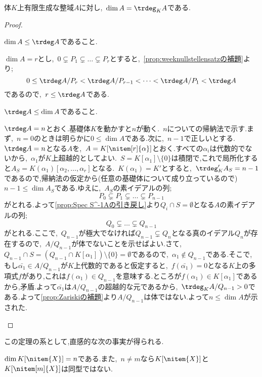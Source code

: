 \begin{thm}\label{thm:有限生成な整域は次元と超越次元が同じ}
	体$K$上有限生成な整域$A$に対し,~$\dim A=\trdeg_K A$である.
\end{thm}
\begin{proof}
	\begin{step}
		\item $\dim A\leq\trdeg A$であること.
		
		$\dim A=r$とし,~$0\subsetneq P _1\subsetneq\dots\subsetneq P _r$とすると,~\ref{prop:weeknullstellensatzの補題}より;
		\[0\leq\trdeg A/ P _r<\trdeg A/ P _{r-1}<\dots<\trdeg A/ P _1<\trdeg A\]
		であるので,~$r\leq\trdeg A$である.
		
		\item $\trdeg A\leq\dim A$であること.
		
		$\trdeg A=n$とおく.基礎体$K$を動かすと$n$が動く.~$n$についての帰納法で示す.まず,~$n=0$のときは明らかに$0\leq\dim A$である.次に,~$n-1$で正しいとする.~$\trdeg A=n$となる$A$を,~$A=K[\nitem[r]{\alpha}]$とおく.すべての$\alpha_i$は代数的でないから,~$\alpha_1$が$K$上超越的としてよい.~$S=K[\alpha_1]\setminus\{0\}$は積閉で,これで局所化すると$A_S=K(\alpha_1)[\alpha_2,\dots,\alpha_r]$となる.~$K(\alpha_1)=K'$とすると,~$\trdeg_K' A_S=n-1$であるので,帰納法の仮定から(任意の基礎体について成り立っているので)~$n-1\leq\dim A_S$である.ゆえに,~$A_S$の素イデアルの列;
		\[ P _0\subsetneq P _1\subsetneq\dots\subsetneq P _{n-1}\]
		がとれる.よって\ref{prop:Spec S^-1Aの引き戻し}より$ Q _i\cap S=\emptyset$となる$A$の素イデアルの列;
		\[ Q _0\subsetneq\dots\subsetneq Q _{n-1}\]
		がとれる.ここで,~$ Q _{n-1}$が極大でなければ$ Q _{n-1}\subsetneq Q _n$となる真のイデアル$ Q _n$が存在するので,~$A/ Q _{n-1}$が体でないことを示せばよい.さて,~$ Q _{n-1}\cap S=( Q _{n-1}\cap K[\alpha_1])\setminus\{0\}=\emptyset$であるので,~$\alpha_1\not\in Q _{n-1}$である.そこで,もし$\bar{\alpha_1}\in A/ Q _{n-1}$が$K$上代数的であると仮定すると,~$f(\bar{\alpha_1})=0$となる$K$上の多項式$f$があり,これは$f(\alpha_1)\in Q _{n-1}$を意味する.ところが$f(\alpha_1)\in K[\alpha_1]$であるから,矛盾.よって$\bar{\alpha_1}$は$A/ Q _{n-1}$の超越的な元であるから,~$\trdeg_K A/ Q _{n-1}>0$である.よって\ref{prop:Zariskiの補題}より$A/ Q _{n-1}$は体ではない.よって$n\leq\dim A$が示された.
	\end{step}
\end{proof}

この定理の系として,直感的な次の事実が得られる.
\begin{cor}\label{cor:多項式環の次元}
	$\dim K[\nitem{X}]=n$である.また,~$n\neq m$なら$K[\nitem{X}]$と$K[\nitem[m]{X}]$は同型ではない.
\end{cor}



